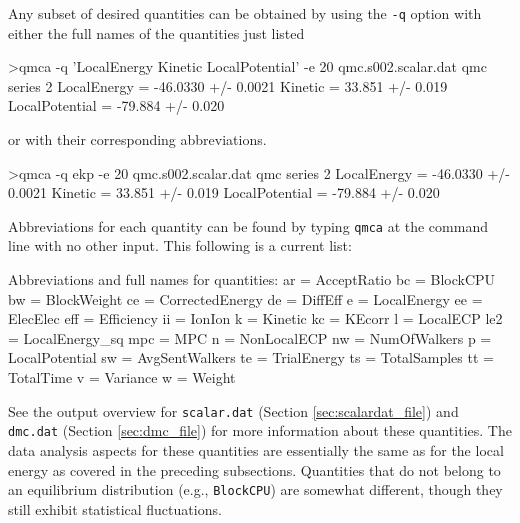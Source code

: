 Any subset of desired quantities can be obtained by using the 
\texttt{-q} option with either the full names of the quantities 
just listed 
\begin{shade}
>qmca -q 'LocalEnergy Kinetic LocalPotential' -e 20 qmc.s002.scalar.dat 
qmc  series 2 
  LocalEnergy           =          -46.0330 +/-           0.0021 
  Kinetic               =            33.851 +/-            0.019 
  LocalPotential        =           -79.884 +/-            0.020 
\end{shade}
\noindent
or with their corresponding abbreviations.
\begin{shade}
>qmca -q ekp -e 20 qmc.s002.scalar.dat 
qmc  series 2 
  LocalEnergy           =          -46.0330 +/-           0.0021 
  Kinetic               =            33.851 +/-            0.019 
  LocalPotential        =           -79.884 +/-            0.020 
\end{shade}
\noindent
Abbreviations for each quantity can be found by typing \texttt{qmca}
at the command line with no other input.  This following is a current list:
\begin{shade}
  Abbreviations and full names for quantities:
    ar              = AcceptRatio
    bc              = BlockCPU
    bw              = BlockWeight
    ce              = CorrectedEnergy
    de              = DiffEff
    e               = LocalEnergy
    ee              = ElecElec
    eff             = Efficiency
    ii              = IonIon
    k               = Kinetic
    kc              = KEcorr
    l               = LocalECP
    le2             = LocalEnergy_sq
    mpc             = MPC
    n               = NonLocalECP
    nw              = NumOfWalkers
    p               = LocalPotential
    sw              = AvgSentWalkers
    te              = TrialEnergy
    ts              = TotalSamples
    tt              = TotalTime
    v               = Variance
    w               = Weight
\end{shade}
\noindent
See the output overview for \texttt{scalar.dat} 
(Section \ref{sec:scalardat_file}) and \texttt{dmc.dat} 
(Section \ref{sec:dmc_file}) for more information about 
these quantities.  The data analysis aspects for these 
quantities are essentially the same as for the local 
energy as covered in the preceding subsections. 
Quantities that do not belong to an equilibrium distribution 
(e.g., \texttt{BlockCPU}) are somewhat different, though they 
still exhibit statistical fluctuations.


